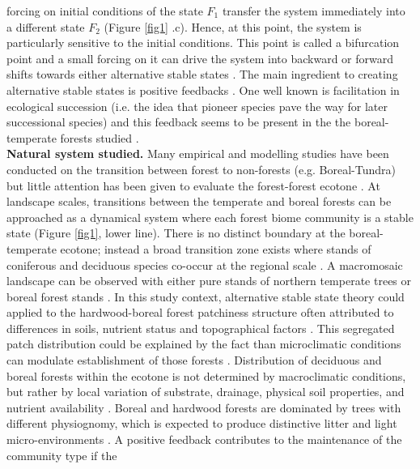 forcing on initial conditions of the state $F_1$ transfer the system
immediately into a different state $F_2$ (Figure \ref{fig1} .c). Hence, at
this point, the system is particularly sensitive to the initial conditions.
This point is called a bifurcation point and a small forcing on it can drive
the system into backward or forward shifts towards either alternative stable
states \cite{scheffer2009critical}. The main ingredient to creating
alternative stable states is positive feedbacks \cite{scheffer2009critical}.
One well known is facilitation in ecological succession (i.e. the idea that
pioneer species pave the way for later successional species) and this feedback
seems to be present in the the boreal-temperate forests studied
\cite{Barras1998,Society2014}. \\


\textbf{Natural system studied.} Many empirical and modelling studies have been
conducted on the transition between forest to non-forests (e.g. Boreal-Tundra) 
\cite{Scheffer2012,Scheffer2001,Hirota2011,Messaoud2007} but little
attention has been given to evaluate the forest-forest ecotone
\cite{Goldblum2010,Graignic2013,Messaoud2007}. At landscape scales, transitions
between  the temperate and boreal forests can be approached as a dynamical
system where each forest biome community is a stable state (Figure \ref{fig1},
lower line). There is no distinct boundary at the boreal-temperate ecotone;
instead a broad transition zone exists where stands of coniferous and
deciduous species co-occur at the regional scale
\cite{Goldblum2010,Fisichelli2013}. A macromosaic landscape can be observed
with either pure stands of northern temperate trees or boreal forest stands
\cite{Goldblum2010,Fisichelli2013}. In this study context, alternative stable
state theory could applied to the hardwood-boreal forest patchiness structure
often attributed to differences in soils, nutrient status and topographical
factors \cite{Society2014}. This segregated patch distribution could be
explained by the fact than microclimatic conditions can modulate establishment
of those forests \cite{DeFrenne2013}. Distribution of deciduous and boreal
forests within the ecotone is not determined by macroclimatic conditions, but
rather by local variation of substrate, drainage, physical soil properties,
and nutrient availability \cite{Goldblum2010,Society2014}. Boreal and hardwood
forests are dominated by trees with different physiognomy, which is expected
to produce distinctive litter and light micro-environments \cite{Barras1998}.
A positive feedback contributes to the maintenance of the community type if the
